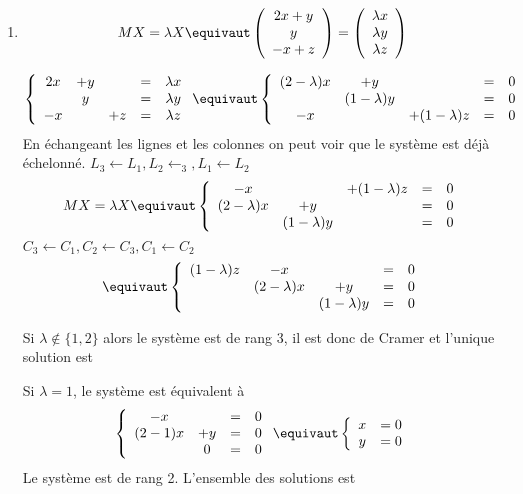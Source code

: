 \begin{correction}
\begin{enumerate}
\item
$$MX=\lambda X \equivaut   \left( \begin{array}{c}
2x +y  \\
 y \\
 -x +z
\end{array}\right) = \left(
\begin{array}{c}
\lambda x\\
\lambda y\\
\lambda z
\end{array} \right)$$ 

$$\left\{ \begin{array}{ccccc}
2x &+y& & =&\lambda x \\
 &y & & =& \lambda y \\
 -x& &+z&=&\lambda z
\end{array}\right. 
\equivaut \left\{ \begin{array}{ccccc}
(2-\lambda)x &+y& & =&0 \\
 &(1-\lambda)y & & =& 0 \\
 -x& &+(1-\lambda)z&=&0
\end{array}\right. 
$$ 
 En échangeant les lignes et les colonnes on peut voir que le système est déjà échelonné.
$L_3\leftarrow L_1, L_2 \leftarrow _3, L_1\leftarrow L_2$
$$MX=\lambda X 
\equivaut  \left\{ \begin{array}{ccccc}
 -x& &+(1-\lambda)z&=&0\\
(2-\lambda)x &+y& & =&0 \\
 &(1-\lambda)y & & =& 0 
\end{array}\right.$$
$ C_3\leftarrow C_1, C_2 \leftarrow C_3, C_1\leftarrow C_2$
$$
\equivaut \left\{ \begin{array}{ccccc}
 (1-\lambda)z&-x& &=&0\\
 &(2-\lambda)x&+y & =&0 \\
 &  & (1-\lambda)y& =& 0 
\end{array}\right.$$

Si $\lambda \notin \{ 1,2\} $ alors le système est de rang 3, il est donc de Cramer et l'unique solution est 

Si $\lambda =1$, le système est équivalent à 
$$\left\{ \begin{array}{cccc}
 -x& &=&0\\
 (2-1)x&+y & =&0 \\
   & 0& =& 0 
\end{array}\right. \equivaut \left\{ \begin{array}{cc}
 x& =0\\
 y&  =0
\end{array}\right.$$
Le système est de rang 2. L'ensemble des solutions est 


\end{enumerate}
\end{correction}
